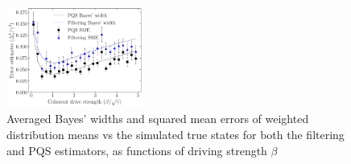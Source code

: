 \documentclass[aps,pra,twocolumn,groupedaddress,showpacs]{revtex4}
\begin{document}
 \begin{figure}[h!]
    \centering
    \centering
    \includegraphics[width=0.4\textwidth]{drive_strength_figure.pdf}
    \caption{Averaged Bayes' widths and squared mean errors of weighted distribution means vs the simulated true states for both the filtering and PQS estimators, as functions of driving strength $\beta$}
    \label{beta_figure}
\end{figure}
\end{document}
